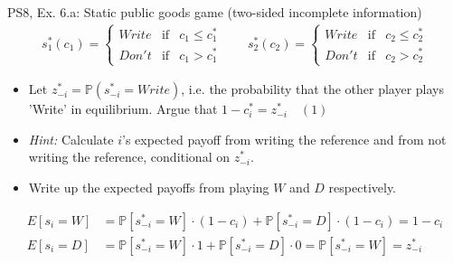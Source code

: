 \begin{frame}{PS8, Ex. 6.a: Static public goods game (two-sided incomplete information)}
    \begin{align*}
      s_1^*(c_1)=\left\{\begin{array}{rcl}
        Write & \text{if} & c_1\leq c_1^*\\
        Don't & \text{if} & c_1>c_1^*
        \end{array}\right.\quad\quad
      s_2^*(c_2)=\left\{\begin{array}{rcl}
        Write & \text{if} & c_2\leq c_2^*\\
        Don't & \text{if} & c_2>c_2^*
        \end{array}\right.
    \end{align*}
    \vspace{-12pt}
    \begin{itemize}
      \item[(a)] Let $z_{-i}^* = \mathbb{P}(s_{-i}^*=Write)$, i.e. the probability that the other player plays 'Write' in equilibrium. Argue that $1-c_i^*=z_{-i}^*\quad(1)$
      \item[] \textit{Hint:} Calculate $i$'s expected payoff from writing the reference and from not writing the reference, conditional on $z_{-i}^*$.
    \end{itemize}
    \vspace{-8pt}
    \begin{itemize}
      \item[Step 1:] Write up the expected payoffs from playing $W$ and $D$ respectively.
    \end{itemize}
    \vspace{-8pt}
    \begin{align*}
      E[s_i=W]&=\mathbb{P}\left[s_{-i}^*=W\right]\cdot(1-c_i)+\mathbb{P}\left[s_{-i}^*=D\right]\cdot(1-c_i)=1-c_i\\
      E[s_i=D]&=\mathbb{P}\left[s_{-i}^*=W\right]\cdot1+\mathbb{P}\left[s_{-i}^*=D\right]\cdot0=\mathbb{P}\left[s_{-i}^*=W\right]=z_{-i}^*
    \end{align*}
    \vfill\null
\end{frame}
